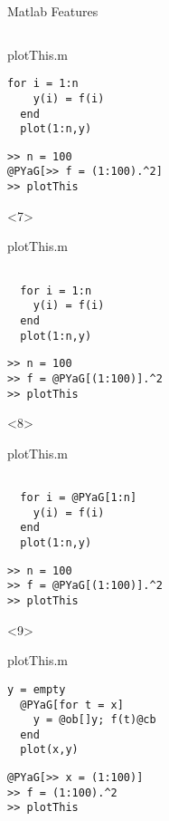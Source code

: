 \begin{frame}[fragile]{Matlab Features}
\begin{columns}
\begin{column}[T]{5cm}
\begin{onlyenv}
\begin{block}{plotThis.m}
\begin{Verbatim}[commandchars=@\[\]]
  for i = 1:n
    y(i) = f(i)
  end
  plot(1:n,y)
          \end{Verbatim}
        \end{block}
          \begin{Verbatim}[commandchars=@\[\]]
>> n = 100
@PYaG[>> f = (1:100).^2]
>> plotThis
        \end{Verbatim}
      \end{onlyenv}
      \begin{onlyenv}<7>
        \begin{block}{plotThis.m}
          \begin{Verbatim}[commandchars=@\[\]]

  for i = 1:n
    y(i) = f(i)
  end
  plot(1:n,y)
          \end{Verbatim}
        \end{block}
          \begin{Verbatim}[commandchars=@\[\]]
>> n = 100
>> f = @PYaG[(1:100)].^2
>> plotThis
        \end{Verbatim}
      \end{onlyenv}
      \begin{onlyenv}<8>
        \begin{block}{plotThis.m}
          \begin{Verbatim}[commandchars=@\[\]]

  for i = @PYaG[1:n]
    y(i) = f(i)
  end
  plot(1:n,y)
          \end{Verbatim}
        \end{block}
          \begin{Verbatim}[commandchars=@\[\]]
>> n = 100
>> f = @PYaG[(1:100)].^2
>> plotThis
        \end{Verbatim}
      \end{onlyenv}
      \begin{onlyenv}<9>
        \begin{block}{plotThis.m}
          \begin{Verbatim}[commandchars=@\[\]]
  y = empty
  @PYaG[for t = x]
    y = @ob[]y; f(t)@cb
  end
  plot(x,y)
          \end{Verbatim}
        \end{block}
          \begin{Verbatim}[commandchars=@\[\]]
@PYaG[>> x = (1:100)]
>> f = (1:100).^2
>> plotThis
        \end{Verbatim}
      \end{onlyenv}


\end{column}
\end{columns}
\end{frame}
